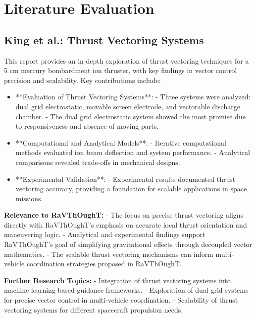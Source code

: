 % 

\section{Literature Evaluation}

\subsection{King et al.: Thrust Vectoring Systems}

This report provides an in-depth exploration of thrust vectoring techniques for a 5 cm mercury bombardment ion thruster, with key findings in vector control precision and scalability. Key contributions include:

\begin{itemize}
  \item **Evaluation of Thrust Vectoring Systems**:
  - Three systems were analyzed: dual grid electrostatic, movable screen electrode, and vectorable discharge chamber.
  - The dual grid electrostatic system showed the most promise due to responsiveness and absence of moving parts.

  \item **Computational and Analytical Models**:
  - Iterative computational methods evaluated ion beam deflection and system performance.
  - Analytical comparisons revealed trade-offs in mechanical designs.

  \item **Experimental Validation**:
  - Experimental results documented thrust vectoring accuracy, providing a foundation for scalable applications in space missions.
\end{itemize}

\textbf{Relevance to RaVThOughT:}
- The focus on precise thrust vectoring aligns directly with RaVThOughT’s emphasis on accurate local thrust orientation and maneuvering logic.
- Analytical and experimental findings support RaVThOughT’s goal of simplifying gravitational effects through decoupled vector mathematics.
- The scalable thrust vectoring mechanisms can inform multi-vehicle coordination strategies proposed in RaVThOughT.

\textbf{Further Research Topics:}
- Integration of thrust vectoring systems into machine learning-based guidance frameworks.
- Exploration of dual grid systems for precise vector control in multi-vehicle coordination.
- Scalability of thrust vectoring systems for different spacecraft propulsion needs.

